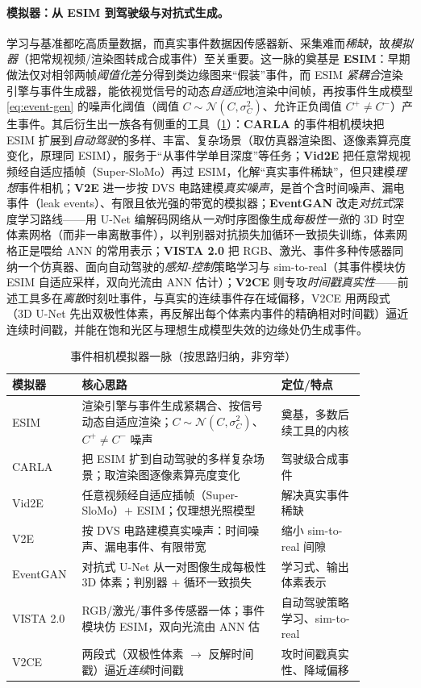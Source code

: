 \paragraph{模拟器：从 ESIM 到驾驶级与对抗式生成。}
学习与基准都吃高质量数据，而真实事件数据因传感器新、采集难而\emph{稀缺}，故\emph{模拟器}（把常规视频/渲染图转成合成事件）至关重要。这一脉的奠基是 \textbf{ESIM}\cite{rebecq2018esim}：早期做法仅对相邻两帧\emph{阈值化}差分得到类边缘图来“假装”事件，而 ESIM \emph{紧耦合}渲染引擎与事件生成器，能依视觉信号的动态\emph{自适应}地渲染中间帧，再按事件生成模型 \cref{eq:event-gen} 的噪声化阈值（阈值 $C\sim\mathcal N(C,\sigma_C^2)$、允许正负阈值 $C^+\!\ne\! C^-$）产生事件\cite{carlone2026handbook}。其后衍生出一族各有侧重的工具（\cref{tab:event-sims}）：\textbf{CARLA} 的事件相机模块把 ESIM 扩展到\emph{自动驾驶}的多样、丰富、复杂场景（取仿真器渲染图、逐像素算亮度变化，原理同 ESIM），服务于“从事件学单目深度”等任务；\textbf{Vid2E} 把任意常规视频经自适应插帧（Super-SloMo）再过 ESIM，化解“真实事件稀缺”，但只建模\emph{理想}事件相机；\textbf{V2E} 进一步按 DVS 电路建模\emph{真实噪声}，是首个含时间噪声、漏电事件（leak events）、有限且依光强的带宽的模拟器；\textbf{EventGAN} 改走\emph{对抗式}深度学习路线——用 U-Net 编解码网络从\emph{一对}时序图像生成\emph{每极性一张}的 3D 时空体素网格（而非一串离散事件），以判别器对抗损失加循环一致损失训练，体素网格正是喂给 ANN 的常用表示；\textbf{VISTA 2.0} 把 RGB、激光、事件多种传感器同纳一个仿真器、面向自动驾驶的\emph{感知-控制}策略学习与 sim-to-real（其事件模块仿 ESIM 自适应采样，双向光流由 ANN 估计）；\textbf{V2CE} 则专攻\emph{时间戳真实性}——前述工具多在\emph{离散}时刻吐事件，与真实的连续事件存在域偏移，V2CE 用两段式（3D U-Net 先出双极性体素，再反解出每个体素内事件的精确相对时间戳）逼近连续时间戳，并能在饱和光区与理想生成模型失效的边缘处仍生成事件\cite{carlone2026handbook,gallego2022eventsurvey}。

\begin{table}[H]\centering\small
\caption{事件相机模拟器一脉（按思路归纳，非穷举）}
\label{tab:event-sims}
\begin{tabular}{p{0.13\linewidth}p{0.52\linewidth}p{0.22\linewidth}}
\toprule
模拟器 & 核心思路 & 定位/特点 \\
\midrule
ESIM & 渲染引擎与事件生成紧耦合、按信号动态自适应渲染；$C\sim\mathcal N(C,\sigma_C^2)$、$C^+\!\ne\! C^-$ 噪声 & 奠基，多数后续工具的内核 \\
CARLA & 把 ESIM 扩到自动驾驶的多样复杂场景；取渲染图逐像素算亮度变化 & 驾驶级合成事件 \\
Vid2E & 任意视频经自适应插帧（Super-SloMo）$+$ ESIM；仅理想光照模型 & 解决真实事件稀缺 \\
V2E & 按 DVS 电路建模真实噪声：时间噪声、漏电事件、有限带宽 & 缩小 sim-to-real 间隙 \\
EventGAN & 对抗式 U-Net 从一对图像生成每极性 3D 体素；判别器 $+$ 循环一致损失 & 学习式、输出体素表示 \\
VISTA 2.0 & RGB/激光/事件多传感器一体；事件模块仿 ESIM，双向光流由 ANN 估 & 自动驾驶策略学习、sim-to-real \\
V2CE & 两段式（双极性体素 $\to$ 反解时间戳）逼近\emph{连续}时间戳 & 攻时间戳真实性、降域偏移 \\
\bottomrule
\end{tabular}
\end{table}

